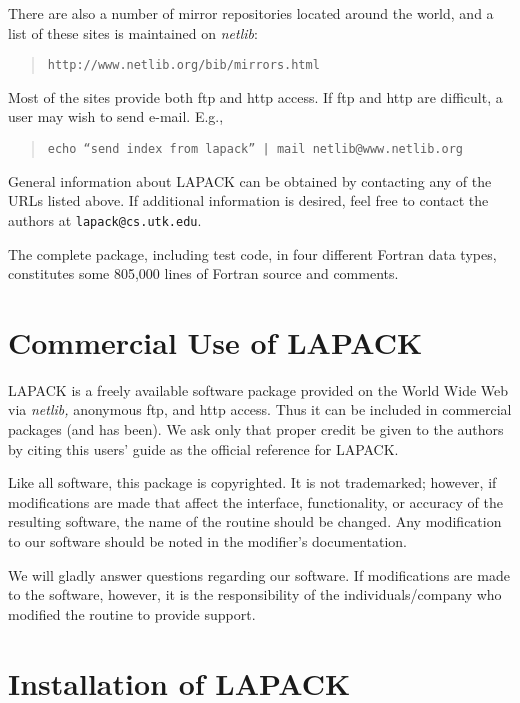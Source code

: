 There are also a number of mirror repositories located around the world, and a list of these sites is maintained on {\em netlib}:
\begin{quote}
{\tt http://www.netlib.org/bib/mirrors.html}
\end{quote}

Most of the sites provide both ftp and http access.  If ftp and http
are difficult, a user may wish to send e-mail.  E.g.,
\begin{quote}
{\tt echo ``send index from lapack'' | mail netlib@www.netlib.org}
\end{quote}

General information about LAPACK can be obtained by contacting any of
the URLs listed above.  If additional information is desired, feel free
to contact the authors at {\tt lapack@cs.utk.edu}.

The complete package, including test code, in four
different Fortran data types, constitutes some 805,000 lines of Fortran
source and comments.

\section{Commercial Use of LAPACK}

LAPACK is a freely available software package provided on the World Wide Web
via {\em netlib,} anonymous ftp, and http access.  Thus it can be included in commercial
packages (and has been).  We ask only that proper credit be given to
the authors by citing this users' guide as the official reference for LAPACK.

Like all software, this package is copyrighted.  It is not trademarked; however,
if modifications are made that affect the interface, functionality, or accuracy of the resulting 
software, the name of the routine should be changed.  Any modification to our software
should be noted in the modifier's documentation.

We will gladly answer questions regarding our software.
If modifications are made to the software, however, it is the
responsibility of the individuals/company who modified the routine to provide support.

\section{Installation of LAPACK}

